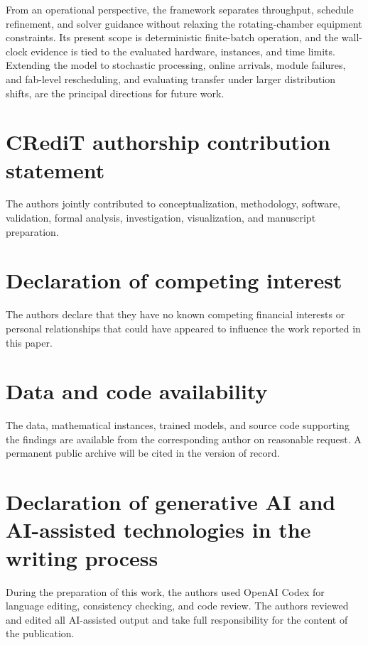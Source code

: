 \documentclass[preprint,12pt,authoryear]{elsarticle}
\begin{document}
From an operational perspective, the framework separates throughput,
schedule refinement, and solver guidance without relaxing the rotating-chamber
equipment constraints. Its present scope is deterministic finite-batch
operation, and the wall-clock evidence is tied to the evaluated hardware,
instances, and time limits. Extending the model to stochastic processing,
online arrivals, module failures, and fab-level rescheduling, and evaluating
transfer under larger distribution shifts, are the principal directions for
future work.

\section*{CRediT authorship contribution statement}

The authors jointly contributed to conceptualization, methodology, software,
validation, formal analysis, investigation, visualization, and manuscript
preparation.

\section*{Declaration of competing interest}

The authors declare that they have no known competing financial interests or
personal relationships that could have appeared to influence the work
reported in this paper.

\section*{Data and code availability}

The data, mathematical instances, trained models, and source code supporting
the findings are available from the corresponding author on reasonable
request. A permanent public archive will be cited in the version of record.

\section*{Declaration of generative AI and AI-assisted technologies in the writing process}

During the preparation of this work, the authors used OpenAI Codex for
language editing, consistency checking, and code review. The authors reviewed
and edited all AI-assisted output and take full responsibility for the content
of the publication.



\end{document}
